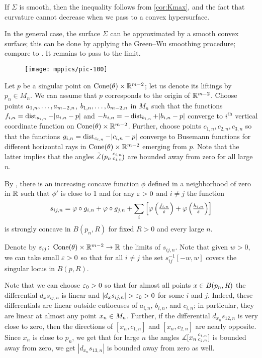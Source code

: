  If $\Sigma$ is smooth, then the inequality follows from \ref{cor:Kmax}, and the fact that curvature cannot decrease when we pass to a convex hypersurface.

In the general case, the surface $\Sigma$ can be approximated by a smooth convex surface;
this can be done by applying the Green--Wu smoothing procedure; compare to \cite{AKP-buyalo}.
It remains to pass to the limit.
\qeds

\begin{wrapfigure}{r}{35 mm}
\vskip-0mm
\centering
\texttt{[image: mppics/pic-100]}
\vskip0mm
\end{wrapfigure}

Let $p$ be a singular point on $\operatorname{Cone}(\theta)\times \mathbb{R}^{m-2}$;
let us denote its liftings by $p_n\in M_n$.
We can assume that $p$ corresponds to the origin of $\mathbb{R}^{m-2}$.
Choose points $a_{1,n},\zz\dots,a_{m-2,n}$, $b_{1,n},\zz\dots,b_{m-2,n}$ in $M_n$ such that the functions $f_{i,n}\zz=\dist_{a_{i,n}}\zz-|a_{i,n}-p|$ and $-h_{i,n}\zz=-\dist_{b_{i,n}}+|b_{i,n}-p|$ converge to $i^{\text{th}}$ vertical coordinate function on $\Cone(\theta)\zz\times \RR^{m-2}$.
Further, choose points $c_{1,n},c_{2,n},c_{3,n}$ so that the functions $g_{i,n}\zz=\dist_{c_{i,n}}-|c_{i,n}-p|$ converge to Busemann functions for different horizontal rays in $\operatorname{Cone}(\theta)\times \mathbb{R}^{m-2}$ emerging from $p$.
Note that the latter implies that the angles $\tilde\measuredangle(p_n\,{}^{c_{i,n}}_{c_{j,n}}\hspace{-0.2ex})$ are bounded away from zero for all large~$n$.

By \cite[Lemma 7.2.1]{petrunin-conc}, there is an increasing concave function $\phi$ defined in a neighborhood of zero in $\mathbb{R}$ such that $\phi'$ is close to 1 and for any $\varepsilon>0$ and $i\ne j$ the function 
\[s_{ij,n}
=
\varphi\circ g_{i,n}
+
\varphi\circ g_{j,n}
+
\sum_i\left[\varphi\left(\tfrac{f_{i,n}}{\varepsilon}\right)+\varphi\left(\tfrac{h_{i,n}}{\varepsilon}\right)\right]\]
is strongly concave in $B(p_n,R)$ for fixed $R>0$ and every large $n$.

Denote by $s_{ij}\:\Cone(\theta)\zz\times \RR^{m-2}\zz\to \RR$ the limits of $s_{ij,n}$.
Note that given $w>0$, we can take small $\varepsilon>0$ so that for all $i\ne j$ the set $s_{ij}^{-1}[-w,w]$ covers the singular locus in $B(p,R)$. 

Note that we can choose $\varepsilon_0>0$ so that for almost all points $x\zz\in B(p_n,R)$ 
the differential $d_xs_{ij,n}$ is linear and $|d_xs_{ij,n}|>\eps_0>0$ for some $i$ and $j$.
Indeed, these differentials are linear outside cutlocuses of $a_{i,n}$, $b_{i,n}$, and $c_{i,n}$;
in particular, they are linear at almost any point $x_n\zz\in M_n$.
Further, if the differential $d_{x_n}s_{12,n}$ is very close to zero,
then the directions of $[x_n,c_{1,n}]$ and $[x_n,c_{2,n}]$ are nearly opposite.
Since $x_n$ is close to $p_n$, we get that for large $n$ the angles $\measuredangle[x_n\,{}^{c_{i,n}}_{c_{j,n}}]$ is bounded away from zero, we get $|d_{x_n}s_{13,n}|$ is bounded away from zero as well.

